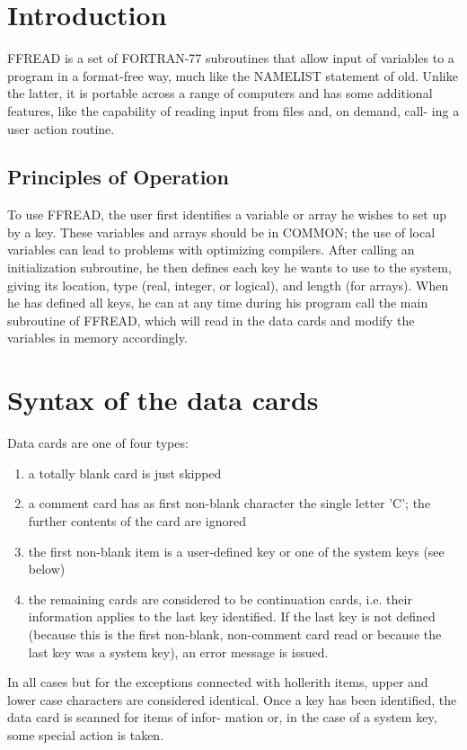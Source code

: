 \chapter{Introduction}
FFREAD is a set of FORTRAN-77 subroutines that allow input of variables to a
program in a format-free way, much like the NAMELIST statement of old. Unlike
the latter, it is portable across a range of computers and has some additional
features, like the capability of reading input from files and, on demand, call-
ing a user action routine.
 
\section{Principles of Operation}
 
To use FFREAD, the user first identifies a variable or array he wishes to set
up by a key. These variables and arrays should be in COMMON; the use of local
variables can lead to problems with optimizing compilers. After calling an
initialization subroutine, he then defines each key he wants to use to the
system, giving its location, type (real, integer, or logical), and length
(for arrays). When he has defined all keys, he can at any time during his
program call the main subroutine of FFREAD, which will read in the data cards
and modify the variables in memory accordingly.
 
 
\chapter{Syntax of the data cards}
 
Data cards are one of four types:
 
\begin{enumerate}
\item
a totally blank card is just skipped
\item
a comment card has as first non-blank character the single letter 'C';
the further contents of the card are ignored
\item
the first non-blank item is a user-defined key or one of the system
keys (see below)
\item
the remaining cards are considered to be continuation cards, i.e. their
information applies to the last key identified. If the last key is not
defined (because this is the first non-blank, non-comment card read or
because the last key was a system key), an error message is issued.
\end{enumerate}
 
In all cases but for the exceptions connected with hollerith items, upper
and lower case characters are considered identical.
Once a key has been identified, the data card is scanned for items of infor-
mation or, in the case of a system key, some special action is taken.
 
